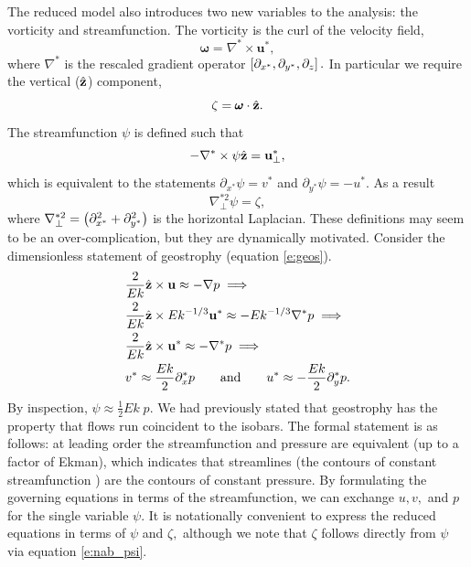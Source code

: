 The reduced model also introduces two new variables to the analysis: the vorticity and streamfunction. 
The vorticity is the curl of the velocity field,
\begin{equation}
	\pmb{\omega} = \nabla^{*} \times \mathbf{u}^{*},
	\label{e:def_omega}
\end{equation}
where $\nabla^{*}$ is the rescaled gradient operator $\ls \partial_{x^{*}},\partial_{y^{*}}, \partial_{z}\rs.$
In particular we require the vertical (${ {\hat{\mathbf{z}}} }$) component,
\[\zeta = \pmb{\omega} \cdot { {\hat{\mathbf{z}}} }.\]
The streamfunction $\psi$ is defined such that
\begin{equation}
	-\nabla^{*}\times \psi{ {\hat{\mathbf{z}}} } = \mathbf{u}_{\perp}^{*},
	\label{e:def_psi}
\end{equation} 
which is equivalent to the statements $\partial_{x^{*}} \psi = v^{*}$ and $\partial_{y^{*}}\psi=-u^{*}$.
As a result
\begin{equation}
	\nabla_{\perp}^{*2} \psi = \zeta,
	\label{e:nab_psi}
\end{equation}
 where $\nabla_{\perp}^{*2} = \left ( \partial_{x^{*}}^{2} + \partial _{y^{*}}^{2}\right ) $ is the horizontal Laplacian.
 These definitions may seem to be an over-complication, but they are dynamically motivated. 
 Consider the dimensionless statement of geostrophy (equation \eqref{e:geos}).
 \[
	 \begin{aligned}
		&\frac{2}{Ek}{ {\hat{\mathbf{z}}} } \times \mathbf{u} \approx -\nabla p \implies\\
		&\frac{2}{Ek}{ {\hat{\mathbf{z}}} } \times Ek^{-1/3}\mathbf{u^{*}} \approx -Ek^{-1/3}\nabla^{*} p \implies\\
		&\frac{2}{Ek} { {\hat{\mathbf{z}}} } \times \mathbf{u}^{*} \approx -\nabla^{*}p \implies\\
		&v^{*} \approx \frac{Ek}{2}\partial_{x}^{*}p \qquad \text{and} \qquad u^{*} \approx -\frac{Ek}{2}\partial_{y}^{*}p.
	 \end{aligned}
 \]
 By inspection, $\psi \approx \frac{1}{2}Ek\;p$. 
 We had previously stated that geostrophy has the property that flows run coincident to the isobars.
 The formal statement is as follows: 
 at leading order the streamfunction and pressure are equivalent (up to a factor of Ekman), which indicates that streamlines (the contours of constant streamfunction \citep{dT01}) are the contours of constant pressure. 
 By formulating the governing equations in terms of the streamfunction, we can exchange $u,v,$ and $p$ for the single variable $\psi.$ It is notationally convenient to express the reduced equations in terms of $\psi$ and $\zeta,$ although we note that $\zeta$ follows directly from $\psi$ via equation \eqref{e:nab_psi}.
 
